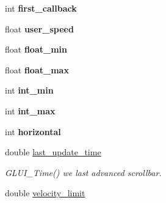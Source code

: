 \begin{DoxyCompactItemize}
\item 
\hypertarget{classGLUI__Scrollbar_afef0631b46631c19c611d2dfbdc18037}{int {\bfseries first\-\_\-callback}}\label{classGLUI__Scrollbar_afef0631b46631c19c611d2dfbdc18037}

\item 
\hypertarget{classGLUI__Scrollbar_adbe7ab0e108162ac4283cba69fa69409}{float {\bfseries user\-\_\-speed}}\label{classGLUI__Scrollbar_adbe7ab0e108162ac4283cba69fa69409}

\item 
\hypertarget{classGLUI__Scrollbar_ac758eab57fb82a16a44450941ec4ff2c}{float {\bfseries float\-\_\-min}}\label{classGLUI__Scrollbar_ac758eab57fb82a16a44450941ec4ff2c}

\item 
\hypertarget{classGLUI__Scrollbar_aa903ec06872ab647be22bbbf392f0061}{float {\bfseries float\-\_\-max}}\label{classGLUI__Scrollbar_aa903ec06872ab647be22bbbf392f0061}

\item 
\hypertarget{classGLUI__Scrollbar_a984c4451659fe22bf37ef5f1059c45d2}{int {\bfseries int\-\_\-min}}\label{classGLUI__Scrollbar_a984c4451659fe22bf37ef5f1059c45d2}

\item 
\hypertarget{classGLUI__Scrollbar_af3438f0e574be6bf20478ef23ac630cf}{int {\bfseries int\-\_\-max}}\label{classGLUI__Scrollbar_af3438f0e574be6bf20478ef23ac630cf}

\item 
\hypertarget{classGLUI__Scrollbar_a88e6346cf53594ae33a97d0fb1b630d3}{int {\bfseries horizontal}}\label{classGLUI__Scrollbar_a88e6346cf53594ae33a97d0fb1b630d3}

\item 
\hypertarget{classGLUI__Scrollbar_a413909d1d5c47657e963fb2ce30e2456}{double \hyperlink{classGLUI__Scrollbar_a413909d1d5c47657e963fb2ce30e2456}{last\-\_\-update\-\_\-time}}\label{classGLUI__Scrollbar_a413909d1d5c47657e963fb2ce30e2456}

\begin{DoxyCompactList}\small\item\em G\-L\-U\-I\-\_\-\-Time() we last advanced scrollbar. \end{DoxyCompactList}\item 
\hypertarget{classGLUI__Scrollbar_a3d738432dded440f6733bdd95116622e}{double \hyperlink{classGLUI__Scrollbar_a3d738432dded440f6733bdd95116622e}{velocity\-\_\-limit}}\label{classGLUI__Scrollbar_a3d738432dded440f6733bdd95116622e}


\end{DoxyCompactItemize}
